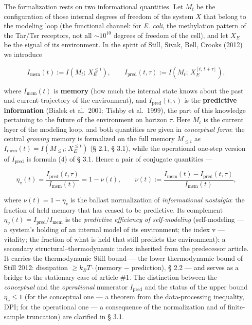 \documentclass[pdflatex,sn-mathphys-ay]{sn-jnl}
\begin{document}
The formalization rests on two informational quantities. Let \(M_t\) be the configuration of those internal degrees of freedom of the system \(X\) that belong to the modeling loop (the functional channel: for \emph{E. coli}, the methylation pattern of the Tar/Tsr receptors, not all \(\sim 10^{10}\) degrees of freedom of the cell), and let \(X_E\) be the signal of its environment. In the spirit of Still, Sivak, Bell, Crooks (2012) we introduce



\[I_{\text{mem}}(t) := I\!\left(M_t;\, X_E^{\le t}\right), \qquad I_{\text{pred}}(t,\tau) := I\!\left(M_t;\, X_E^{[t,\,t+\tau]}\right),\]



where \(I_{\text{mem}}(t)\) is \textbf{memory} (how much the internal state knows about the past and current trajectory of the environment), and \(I_{\text{pred}}(t,\tau)\) is the \textbf{predictive information} (Bialek et al.~2001; Tishby et al.~1999), the part of this knowledge pertaining to the future of the environment on horizon \(\tau\). Here \(M_t\) is the current layer of the modeling loop, and both quantities are given in \emph{conceptual form}: the central \emph{growing} memory is formalized on the full memory \(M_{\le t}\) as \(I_{\text{mem}}(t) = I(M_{\le t}; X_E^{\le t})\) (§ 2.1, § 3.1), while the operational one-step version of \(I_{\text{pred}}\) is formula (4) of § 3.1. Hence a pair of conjugate quantities ---



\begin{equation}\eta_v(t) = \frac{I_{\text{pred}}(t,\tau)}{I_{\text{mem}}(t)} = 1 - \nu(t), \qquad \nu(t) := \frac{I_{\text{mem}}(t) - I_{\text{pred}}(t,\tau)}{I_{\text{mem}}(t)}, \tag{1}\end{equation}



where \(\nu(t) = 1 - \eta_v\) is the ballast normalization of \emph{informational nostalgia}: the fraction of held memory that has ceased to be predictive. Its complement \(\eta_v(t) = I_{\text{pred}}/I_{\text{mem}}\) is the \emph{predictive efficiency of self-modeling} (self-modeling --- a system's holding of an internal model of its environment; the index v --- vitality; the fraction of what is held that still predicts the environment): a secondary structural--thermodynamic index inherited from the predecessor article. It carries the thermodynamic Still bound --- the lower thermodynamic bound of Still 2012: dissipation \(\ge k_B T\cdot\)(memory \(-\) prediction), § 2.2 --- and serves as a bridge to the stationary case of article \#1. The distinction between the \emph{conceptual} and the \emph{operational} numerator \(I_{\text{pred}}\) and the status of the upper bound \(\eta_v \le 1\) (for the conceptual one --- a theorem from the data-processing inequality, DPI; for the operational one --- a consequence of the normalization and of finite-sample truncation) are clarified in § 3.1.
\end{document}
